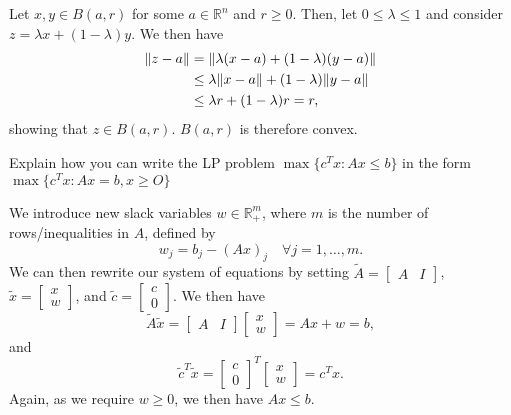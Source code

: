 \begin{solution}
  Let $x, y \in B(a, r)$ for some $a \in \mathbb{R}^n$ and $r \geq 0$.
  Then, let $0 \leq \lambda \leq 1$ and consider $z = \lambda x + (1 - \lambda) y$.
  We then have
  \begin{equation}
    \begin{split}
      \lVert z - a\rVert &= \lVert\lambda (x - a) + (1 - \lambda) (y - a)\rVert \\
      &\leq \lambda \lVert x - a\rVert + (1 - \lambda) \lVert y - a\rVert \\
      &\leq \lambda r + (1 - \lambda) r = r,
    \end{split}
  \end{equation}
  showing that $z \in B(a, r)$.
  $B(a, r)$ is therefore convex.
\end{solution}

\begin{exercise}
  Explain how you can write the LP problem $\max\{ c^T x : Ax \leq b \}$ in the form $\max\{ c^T x : Ax = b, x \geq O \}$
\end{exercise}

\begin{solution}
  We introduce new slack variables $w \in \mathbb{R}^m_+$, where $m$ is the number of rows/inequalities in $A$, defined by
  \begin{equation}
    w_j = b_j - (Ax)_j \quad \forall j = 1, \ldots, m.
  \end{equation}
  We can then rewrite our system of equations by setting $\tilde{A} =
  \begin{bmatrix} A & I
  \end{bmatrix}$, $\tilde{x} =
  \begin{bmatrix} x \\ w
  \end{bmatrix}$, and $\tilde{c} =
  \begin{bmatrix} c \\ 0
  \end{bmatrix}$.
  We then have
  \begin{equation}
    \tilde{A} \tilde{x} =
    \begin{bmatrix} A & I
    \end{bmatrix}
    \begin{bmatrix} x \\ w
    \end{bmatrix} = Ax + w = b,
  \end{equation}
  and
  \begin{equation}
    \tilde{c}^T \tilde{x} =
    \begin{bmatrix} c \\ 0
    \end{bmatrix}^T
    \begin{bmatrix} x \\ w
    \end{bmatrix} = c^T x.
  \end{equation}
  Again, as we require $w \geq 0$, we then have $Ax \leq b$.
\end{solution}

